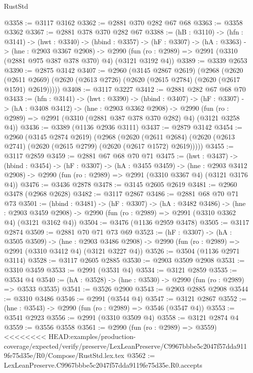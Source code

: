 \begin{lexlean}{RustStd}
\begin{coremodule}
{\begin{coremodule}
{{{{{{{@3358 := @3117 @3162
@3362 := @2881 @370 @282 @67 @68
@3363 := @3358 @3362
@3367 := @2881 @378 @370 @282 @67
@3388 := (hB : @3110) ->
  (hfn : @3141) ->
  (hwt : @3340) ->
  (hbind : @3357) ->
  (hF : @3307) ->
  (hA : @3363) ->
  (hne : @2903 @3367 @2908) ->
  @2990 (fun (ro : @2989) => @2991 (@3310 (@2881 @975 @387 @378 @370) @4) (@3121 @3192 @4))
@3389 := @3339 @2653
@3390 := @2875 @3142
@3407 := @2960
    (@3145 @2867 @2619)
    (@2968
      (@2620 (@2611 @2669) (@2620 (@2613 @2726) (@2620 (@2615 @2784) (@2620 (@2617 @1591) @2619)))))
@3408 := @3117 @3227
@3412 := @2881 @282 @67 @68 @70
@3433 := (hfn : @3141) ->
  (hwt : @3390) ->
  (hbind : @3407) ->
  (hF : @3307) ->
  (hA : @3408 @3412) ->
  (hne : @2903 @3362 @2908) ->
  @2990 (fun (ro : @2989) => @2991 (@3310 (@2881 @387 @378 @370 @282) @4) (@3121 @3258 @4))
@3436 := @3389 (@1136 @2936 @3111)
@3437 := @2879 @3142
@3454 := @2960
    (@3145 @2874 @2619)
    (@2968
      (@2620 (@2611 @2684) (@2620 (@2613 @2741) (@2620 (@2615 @2799) (@2620 (@2617 @1572) @2619)))))
@3455 := @3117 @2859
@3459 := @2881 @67 @68 @70 @71
@3475 := (hwt : @3437) ->
  (hbind : @3454) ->
  (hF : @3307) ->
  (hA : @3455 @3459) ->
  (hne : @2903 @3412 @2908) -> @2990 (fun (ro : @2989) => @2991 (@3310 @3367 @4) (@3121 @3176 @4))
@3476 := @3436 @2878
@3478 := @3145 @2605 @2619
@3481 := @2960 @3478 (@2968 @2628)
@3482 := @3117 @2867
@3486 := @2881 @68 @70 @71 @73
@3501 := (hbind : @3481) ->
  (hF : @3307) ->
  (hA : @3482 @3486) ->
  (hne : @2903 @3459 @2908) -> @2990 (fun (ro : @2989) => @2991 (@3310 @3362 @4) (@3121 @3162 @4))
@3504 := @3476 (@1136 @2959 @3478)
@3505 := @3117 @2874
@3509 := @2881 @70 @71 @73 @69
@3523 := (hF : @3307) ->
  (hA : @3505 @3509) ->
  (hne : @2903 @3486 @2908) -> @2990 (fun (ro : @2989) => @2991 (@3310 @3412 @4) (@3121 @3227 @4))
@3526 := @3504 (@1136 @2971 @3114)
@3528 := @3117 @2605 @2885
@3530 := @2903 @3509 @2908
@3531 := @3310 @3459
@3533 := @2991 (@3531 @4)
@3534 := @3121 @2859
@3535 := @3534 @4
@3540 := (hA : @3528) -> (hne : @3530) -> @2990 (fun (ro : @2989) => @3533 @3535)
@3541 := @3526 @2900
@3543 := @2903 @2885 @2908
@3544 := @3310 @3486
@3546 := @2991 (@3544 @4)
@3547 := @3121 @2867
@3552 := (hne : @3543) -> @2990 (fun (ro : @2989) => @3546 (@3547 @4))
@3553 := @3541 @2923
@3556 := @2991 (@3310 @3509 @4)
@3558 := @3121 @2874 @4
@3559 := @3556 @3558
@3561 := @2990 (fun (ro : @2989) => @3559)
<<<<<<<< HEAD:examples/production-coverage/expected/verify/preserve/LexLeanPreserve/C9967bbbe5c2047f57dda9119fe75d35e/R0/Compose/RustStd.lex.tex
@3562 := LexLeanPreserve.C9967bbbe5c2047f57dda9119fe75d35e.R0.accepts
}}}}}}}
\end{coremodule}}
\end{coremodule}
\end{lexlean}
